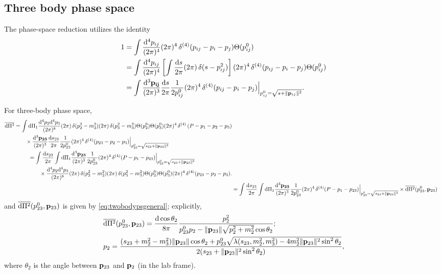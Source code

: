 \documentclass[CheatSheet]{subfiles}
\begin{document}
\subsection{Three body phase space}
The phase-space reduction utilizes the identity~\cite{Hitoshi233B}
\begin{align}
 1
&= \int\frac{\dd^4 p_{ij}}{(2\pi)^4}(2\pi)^4\diracdelta[4](p_{ij}-p_i-p_j)\Theta(p_{ij}^0)
\\
&= \int\frac{\dd^4 p_{ij}}{(2\pi)^4}
\left[\int\frac{\dd s}{2\pi}(2\pi)\diracdelta(s-p_{ij}^2)\right]
(2\pi)^4\diracdelta[4](p_{ij}-p_i-p_j)\Theta(p_{ij}^0)
\\
&= \int\ddP{p_{ij}}
\frac{\dd s}{2\pi}\frac{1}{2p_{ij}^0}
(2\pi)^4\diracdelta[4](p_{ij}-p_i-p_j)\Big|_{p_{ij}^0=\sqrt{s+\|\vc p_{ij}\|^2}}.
\end{align}

For three-body phase space,
\begin{align}
\begin{split}
  \overline{\dd\Pi^3}
 &= \int\dd\Pi_1
 \frac{\dd^4 p_2\dd^4 p_3}{(2\pi)^8}
 (2\pi)\diracdelta(p_2^2-m_2^2)
 (2\pi)\diracdelta(p_3^2-m_3^2)
 \Theta(p_2^0)\Theta(p_3^0)
 (2\pi)^4\diracdelta[4]\left(P-p_1-p_2-p_3\right)
 \\&\qquad\times
\ddP{p_{23}}
\frac{\dd s_{23}}{2\pi}\frac{1}{2p_{23}^0}
(2\pi)^4\diracdelta[4](p_{23}-p_2-p_3)\Big|_{p_{23}^0=\sqrt{s_{23}+\|\vc p_{23}\|^2}}
\end{split}
\\
\begin{split}
 &= \int
\frac{\dd s_{23}}{2\pi}
\int
\dd\Pi_1
\ddP{p_{23}}
\frac{1}{2p_{23}^0}
 (2\pi)^4\diracdelta[4](P-p_1-p_{23})
\Big|_{p_{23}^0=\sqrt{s_{23}+\|\vc p_{23}\|^2}}
 \\&\qquad\times
 \frac{\dd^4 p_2\dd^4 p_3}{(2\pi)^8}
 (2\pi)\diracdelta(p_2^2-m_2^2)
 (2\pi)\diracdelta(p_3^2-m_3^2)
 \Theta(p_2^0)\Theta(p_3^0)
(2\pi)^4\diracdelta[4](p_{23}-p_2-p_3).
\end{split}
\\ &= \int
\frac{\dd s_{23}}{2\pi}
\int
\dd\Pi_1
\ddP{p_{23}}
\frac{1}{2p_{23}^0}
 (2\pi)^4\diracdelta[4](P-p_1-p_{23})
\Big|_{p_{23}^0=\sqrt{s_{23}+\|\vc p_{23}\|^2}}
\times \overline{\dd\Pi^2}(p^0_{23}, \vc p_{23})
\end{align}
and $\overline{{\mathrm{d}}\Pi^2}(p^0_{23}, {\mathbf{p}}_{23})$ is given by \cref{eq:twobodypsgeneral}; explicitly,
\begin{align}
& \overline{\dd\Pi^2}(p^0_{23}, \vc p_{23}) = 
\frac{\dd\cos\theta_{2}}{8\pi}
\frac{p_{2}^2}{p^0_{23}p_2 - \|\vc p_{23}\|\sqrt{p_2^2+m_2^2}\cos\theta_2};
\\
&
p_2=\frac{(s_{23}+m_2^2-m_3^2)\|\vc p_{23}\|\cos\theta_2
 + p_{23}^0\sqrt{\Kallen(s_{23},m_2^2,m_3^2)-4m_2^2 \|\vc p_{23}\|^2 \sin^2\theta_2}
}{2(s_{23}+\|\vc p_{23}\|^2\sin^2\theta_2)},
\end{align}
where $\theta_2$ is the angle between ${\mathbf{p}}_{23}$ and ${\mathbf{p}}_2$ (in the lab frame).
\end{document}
